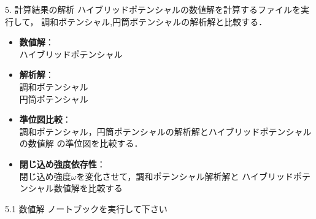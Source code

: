 \documentclass{beamer}
\begin{document}
\begin{frame}{5. 計算結果の解析}
ハイブリッドポテンシャルの数値解を計算するファイルを実行して，
調和ポテンシャル,円筒ポテンシャルの解析解と比較する．
  \begin{itemize}
    \item \textbf{数値解}：  \\
    \rightarrow ハイブリッドポテンシャル
    \item \textbf{解析解}：  \\
    \rightarrow 調和ポテンシャル \\
    \rightarrow 円筒ポテンシャル 
    \item \textbf{準位図比較}：  \\
    \rightarrow 調和ポテンシャル，円筒ポテンシャルの解析解とハイブリッドポテンシャルの数値解
    の準位図を比較する．
    \item \textbf{閉じ込め強度依存性}：  \\
    \rightarrow 閉じ込め強度$\omega$を変化させて，調和ポテンシャル解析解と
    ハイブリッドポテンシャル数値解を比較する
  \end{itemize}
\end{frame}

\begin{frame}{5.1 数値解}
  ノートブックを実行して下さい
\end{frame} 
\end{document}

